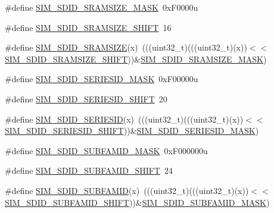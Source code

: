 \begin{DoxyCompactItemize}
\item 
\#define \hyperlink{group___s_i_m___register___masks_gaedb71533a342dcb2cc83241898378b70}{S\+I\+M\+\_\+\+S\+D\+I\+D\+\_\+\+S\+R\+A\+M\+S\+I\+Z\+E\+\_\+\+M\+A\+SK}~0x\+F0000u
\item 
\#define \hyperlink{group___s_i_m___register___masks_ga096c5cec8db3701100c59233e3db0584}{S\+I\+M\+\_\+\+S\+D\+I\+D\+\_\+\+S\+R\+A\+M\+S\+I\+Z\+E\+\_\+\+S\+H\+I\+FT}~16
\item 
\#define \hyperlink{group___s_i_m___register___masks_ga35d378159b24a0e0cc4ac842e0510ee9}{S\+I\+M\+\_\+\+S\+D\+I\+D\+\_\+\+S\+R\+A\+M\+S\+I\+ZE}(x)~(((uint32\+\_\+t)(((uint32\+\_\+t)(x))$<$$<$\hyperlink{group___s_i_m___register___masks_ga096c5cec8db3701100c59233e3db0584}{S\+I\+M\+\_\+\+S\+D\+I\+D\+\_\+\+S\+R\+A\+M\+S\+I\+Z\+E\+\_\+\+S\+H\+I\+FT}))\&\hyperlink{group___s_i_m___register___masks_gaedb71533a342dcb2cc83241898378b70}{S\+I\+M\+\_\+\+S\+D\+I\+D\+\_\+\+S\+R\+A\+M\+S\+I\+Z\+E\+\_\+\+M\+A\+SK})
\item 
\#define \hyperlink{group___s_i_m___register___masks_ga014f6aec38e92afbd07904db6ed617d0}{S\+I\+M\+\_\+\+S\+D\+I\+D\+\_\+\+S\+E\+R\+I\+E\+S\+I\+D\+\_\+\+M\+A\+SK}~0x\+F00000u
\item 
\#define \hyperlink{group___s_i_m___register___masks_ga47e31524526fda3e3058a55da89d098b}{S\+I\+M\+\_\+\+S\+D\+I\+D\+\_\+\+S\+E\+R\+I\+E\+S\+I\+D\+\_\+\+S\+H\+I\+FT}~20
\item 
\#define \hyperlink{group___s_i_m___register___masks_gaef9ed54f0f9c0105ed9e07608e9a5f69}{S\+I\+M\+\_\+\+S\+D\+I\+D\+\_\+\+S\+E\+R\+I\+E\+S\+ID}(x)~(((uint32\+\_\+t)(((uint32\+\_\+t)(x))$<$$<$\hyperlink{group___s_i_m___register___masks_ga47e31524526fda3e3058a55da89d098b}{S\+I\+M\+\_\+\+S\+D\+I\+D\+\_\+\+S\+E\+R\+I\+E\+S\+I\+D\+\_\+\+S\+H\+I\+FT}))\&\hyperlink{group___s_i_m___register___masks_ga014f6aec38e92afbd07904db6ed617d0}{S\+I\+M\+\_\+\+S\+D\+I\+D\+\_\+\+S\+E\+R\+I\+E\+S\+I\+D\+\_\+\+M\+A\+SK})
\item 
\#define \hyperlink{group___s_i_m___register___masks_ga530d8fe59d2589cf56c00456e89487aa}{S\+I\+M\+\_\+\+S\+D\+I\+D\+\_\+\+S\+U\+B\+F\+A\+M\+I\+D\+\_\+\+M\+A\+SK}~0x\+F000000u
\item 
\#define \hyperlink{group___s_i_m___register___masks_ga5e40d63bf136287a591bb4fa0b019aba}{S\+I\+M\+\_\+\+S\+D\+I\+D\+\_\+\+S\+U\+B\+F\+A\+M\+I\+D\+\_\+\+S\+H\+I\+FT}~24
\item 
\#define \hyperlink{group___s_i_m___register___masks_gaba1b690ef87b8401c561fdb1ac2248f0}{S\+I\+M\+\_\+\+S\+D\+I\+D\+\_\+\+S\+U\+B\+F\+A\+M\+ID}(x)~(((uint32\+\_\+t)(((uint32\+\_\+t)(x))$<$$<$\hyperlink{group___s_i_m___register___masks_ga5e40d63bf136287a591bb4fa0b019aba}{S\+I\+M\+\_\+\+S\+D\+I\+D\+\_\+\+S\+U\+B\+F\+A\+M\+I\+D\+\_\+\+S\+H\+I\+FT}))\&\hyperlink{group___s_i_m___register___masks_ga530d8fe59d2589cf56c00456e89487aa}{S\+I\+M\+\_\+\+S\+D\+I\+D\+\_\+\+S\+U\+B\+F\+A\+M\+I\+D\+\_\+\+M\+A\+SK})
$$
\end{DoxyCompactItemize}
